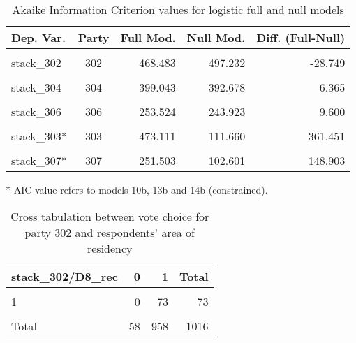\documentclass[
]{article}
\begin{document}
\begin{table}[!h]

\caption{\label{tab:unnamed-chunk-20}Akaike Information Criterion values for logistic full and null models 
        \label{table:logit_aic_bg}}
\centering
\begin{threeparttable}
\begin{tabular}[t]{lcrrr}
\toprule
Dep. Var. & Party & Full Mod. & Null Mod. & Diff. (Full-Null)\\
\midrule
\cellcolor{gray!6}{stack\_301} & \cellcolor{gray!6}{301} & \cellcolor{gray!6}{800.542} & \cellcolor{gray!6}{796.444} & \cellcolor{gray!6}{4.098}\\
stack\_302 & 302 & 468.483 & 497.232 & -28.749\\
\cellcolor{gray!6}{stack\_303} & \cellcolor{gray!6}{303} & \cellcolor{gray!6}{113.534} & \cellcolor{gray!6}{111.660} & \cellcolor{gray!6}{1.874}\\
stack\_304 & 304 & 399.043 & 392.678 & 6.365\\
\cellcolor{gray!6}{stack\_305} & \cellcolor{gray!6}{305} & \cellcolor{gray!6}{411.160} & \cellcolor{gray!6}{403.798} & \cellcolor{gray!6}{7.362}\\
\addlinespace
stack\_306 & 306 & 253.524 & 243.923 & 9.600\\
\cellcolor{gray!6}{stack\_307} & \cellcolor{gray!6}{307} & \cellcolor{gray!6}{104.500} & \cellcolor{gray!6}{102.601} & \cellcolor{gray!6}{1.900}\\
stack\_303* & 303 & 473.111 & 111.660 & 361.451\\
\cellcolor{gray!6}{stack\_306*} & \cellcolor{gray!6}{306} & \cellcolor{gray!6}{111.531} & \cellcolor{gray!6}{243.923} & \cellcolor{gray!6}{-132.392}\\
stack\_307* & 307 & 251.503 & 102.601 & 148.903\\
\bottomrule
\end{tabular}
\begin{tablenotes}[para]
\item[*] AIC value refers to models 10b, 13b and 14b (constrained).
\end{tablenotes}
\end{threeparttable}
\end{table}

\begin{table}

\caption{\label{tab:unnamed-chunk-21}Cross tabulation between vote choice for party 302 and respondents' area of residency 
                   \label{table:crosstab_1_bg}}
\centering
\begin{tabular}[t]{l|r|r|r}
\hline
stack\_302/D8\_rec & 0 & 1 & Total\\
\hline
\cellcolor{gray!6}{0} & \cellcolor{gray!6}{55} & \cellcolor{gray!6}{834} & \cellcolor{gray!6}{889}\\
\hline
1 & 0 & 73 & 73\\
\hline
\cellcolor{gray!6}{NA} & \cellcolor{gray!6}{3} & \cellcolor{gray!6}{51} & \cellcolor{gray!6}{54}\\
\hline
Total & 58 & 958 & 1016\\
\hline
\end{tabular}
\end{table}
\end{document}
